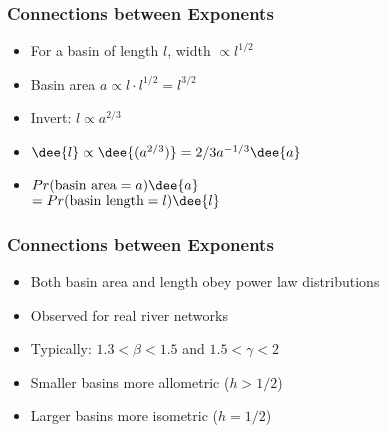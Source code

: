 
\begin{frame}
  \frametitle{Connections between Exponents}

  \begin{itemize}
  \item <1->   
    For a basin of length $l$, width $\propto l^{1/2}$
  \item <2->   
    Basin area $a \propto l\cdot l^{1/2} = l^{3/2}$
  \item <3->   
    Invert: $ l \propto a^{2/3} $
  \item <4->   
    $ \dee{l} \propto \dee{(a^{2/3})} = 2/3 a^{-1/3} \dee{a} $
  \item <5->  
    \alert{$
    Pr(\mbox{basin area} = a) \dee{a}
    $}\\
    $
    =
    Pr(\mbox{basin length} = l) \dee{l}
    $\\
  \end{itemize}

\end{frame}

\begin{frame}
  \frametitle{Connections between Exponents}

  \begin{itemize}
  \item<1-> Both basin area and length obey power law distributions
  \item<2-> Observed for real river networks
  \item<3-> Typically: $1.3 < \beta < 1.5$ and $1.5 < \gamma < 2$
  \item<4-> Smaller basins more allometric ($h>1/2$)
  \item<4-> Larger basins more isometric ($h=1/2$)
  \end{itemize}
  
\end{frame}

